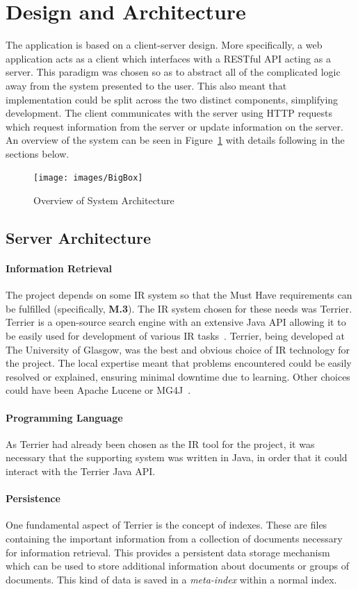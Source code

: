 \documentclass{l4proj}
\begin{document}
\section{Design and Architecture}
The application is based on a client-server design. More specifically, a web application acts as a client which interfaces with a RESTful API acting as a server. This paradigm was chosen so as to abstract all of the complicated logic away from the system presented to the user. This also meant that implementation could be split across the two distinct components, simplifying development.
The client communicates with the server using HTTP requests which request information from the server or update information on the server. An overview of the system can be seen in Figure~\ref{architecture} with details following in the sections below.
\begin{figure}[H]
\centering
\texttt{[image: images/BigBox]}
\caption{Overview of System Architecture}
\label{architecture}
\end{figure}

\subsection{Server Architecture}
\paragraph{Information Retrieval}
The project depends on some IR system so that the Must Have requirements can be fulfilled (specifically, \textbf{M.3}). The IR system chosen for these needs was Terrier. Terrier is a open-source search engine with an extensive Java API allowing it to be easily used for development of various IR tasks~\cite{terrier, macdonald2012puppy}.
Terrier, being developed at The University of Glasgow, was the best and obvious choice of IR technology for the project. The local expertise meant that problems encountered could be easily resolved or explained, ensuring minimal downtime due to learning.
Other choices could have been Apache Lucene or MG4J~\cite{middleton2007comparison}.
\paragraph{Programming Language}
As Terrier had already been chosen as the IR tool for the project, it was necessary that the supporting system was written in Java, in order that it could interact with the Terrier Java API.

\paragraph{Persistence}
One fundamental aspect of Terrier is the concept of indexes. These are files containing the important information from a collection of documents necessary for information retrieval. This provides a persistent data storage mechanism which can be used to store additional information about documents or groups of documents. This kind of data is saved in a \textit{meta-index} within a normal index.
\end{document}
